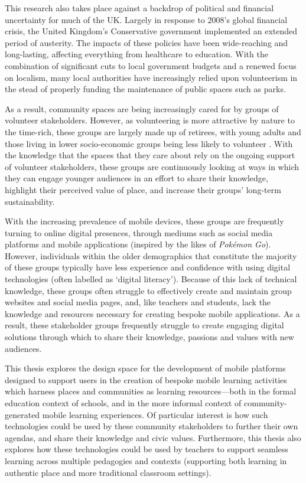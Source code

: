 This research also takes place against a backdrop of political and financial uncertainty for much of the UK. Largely in response to 2008's global financial crisis, the United Kingdom's Conservative government implemented an extended period of austerity. The impacts of these policies have been wide-reaching and long-lasting, affecting everything from healthcare to education. With the combination of significant cuts to local government budgets and a renewed focus on localism, many local authorities have increasingly relied upon volunteerism in the stead of properly funding the maintenance of public spaces such as parks.

As a result, community spaces are being increasingly cared for by groups of volunteer stakeholders. However, as volunteering is more attractive by nature to the time-rich, these groups are largely made up of retirees, with young adults and those living in lower socio-economic groups being less likely to volunteer \citep{ncvo2019}. With the knowledge that the spaces that they care about rely on the ongoing support of volunteer stakeholders, these groups are continuously looking at ways in which they can engage younger audiences in an effort to share their knowledge, highlight their perceived value of place, and increase their groups' long-term sustainability. 

With the increasing prevalence of mobile devices, these groups are frequently turning to online digital presences, through mediums such as social media platforms and mobile applications (inspired by the likes of \textit{Pok\'emon Go}). However, individuals within the older demographics that constitute the majority of these groups typically have less experience and confidence with using digital technologies (often labelled as `digital literacy'). Because of this lack of technical knowledge, these groups often struggle to effectively create and maintain group websites and social media pages, and, like teachers and students, lack the knowledge and resources necessary for creating bespoke mobile applications. As a result, these stakeholder groups frequently struggle to create engaging digital solutions through which to share their knowledge, passions and values with new audiences.

This thesis explores the design space for the development of mobile platforms designed to support users in the creation of bespoke mobile learning activities which harness places and communities as learning resources---both in the formal education context of schools, and in the more informal context of community-generated mobile learning experiences. Of particular interest is how such technologies could be used by these community stakeholders to further their own agendas, and share their knowledge and civic values. Furthermore, this thesis also explores how these technologies could be used by teachers to support seamless learning across multiple pedagogies and contexts (supporting both learning in authentic place and more traditional classroom settings).

